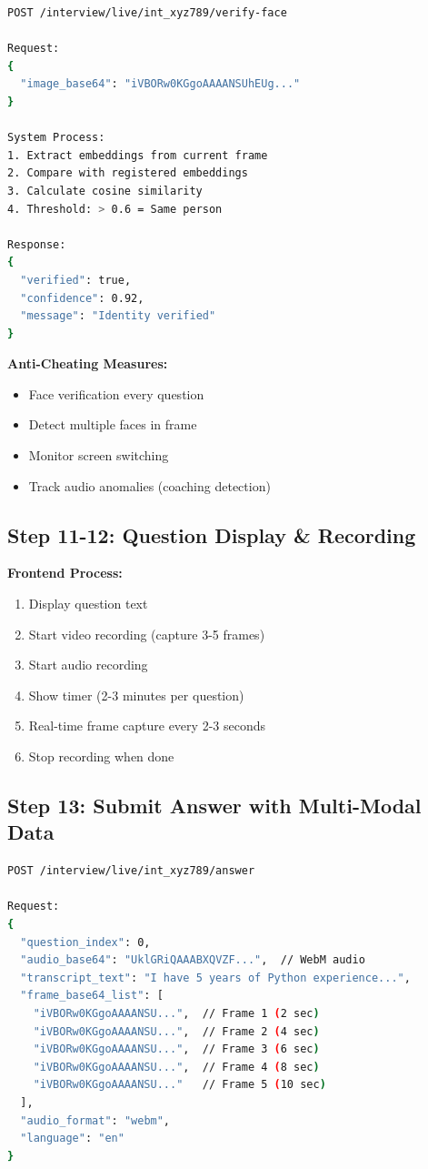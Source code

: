 \documentclass[12pt,a4paper]{article}
\begin{document}
\begin{lstlisting}[language=bash, caption=Face Verification During Interview]
POST /interview/live/int_xyz789/verify-face

Request:
{
  "image_base64": "iVBORw0KGgoAAAANSUhEUg..."
}

System Process:
1. Extract embeddings from current frame
2. Compare with registered embeddings
3. Calculate cosine similarity
4. Threshold: > 0.6 = Same person

Response:
{
  "verified": true,
  "confidence": 0.92,
  "message": "Identity verified"
}
\end{lstlisting}

\textbf{Anti-Cheating Measures:}
\begin{itemize}
    \item Face verification every question
    \item Detect multiple faces in frame
    \item Monitor screen switching
    \item Track audio anomalies (coaching detection)
\end{itemize}

\newpage

\subsection{Step 11-12: Question Display \& Recording}

\textbf{Frontend Process:}
\begin{enumerate}
    \item Display question text
    \item Start video recording (capture 3-5 frames)
    \item Start audio recording
    \item Show timer (2-3 minutes per question)
    \item Real-time frame capture every 2-3 seconds
    \item Stop recording when done
\end{enumerate}

\subsection{Step 13: Submit Answer with Multi-Modal Data}

\begin{lstlisting}[language=bash, caption=Submit Answer API (Enhanced)]
POST /interview/live/int_xyz789/answer

Request:
{
  "question_index": 0,
  "audio_base64": "UklGRiQAAABXQVZF...",  // WebM audio
  "transcript_text": "I have 5 years of Python experience...",
  "frame_base64_list": [
    "iVBORw0KGgoAAAANSU...",  // Frame 1 (2 sec)
    "iVBORw0KGgoAAAANSU...",  // Frame 2 (4 sec)
    "iVBORw0KGgoAAAANSU...",  // Frame 3 (6 sec)
    "iVBORw0KGgoAAAANSU...",  // Frame 4 (8 sec)
    "iVBORw0KGgoAAAANSU..."   // Frame 5 (10 sec)
  ],
  "audio_format": "webm",
  "language": "en"
}
\end{lstlisting}
\end{document}
